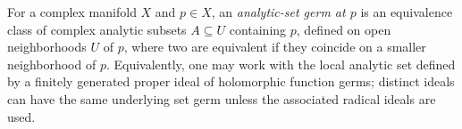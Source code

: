 
For a complex manifold $X$ and $p\in X$, an \emph{analytic-set germ at $p$} is an equivalence class of complex analytic subsets $A\subseteq U$ containing $p$, defined on open neighborhoods $U$ of $p$, where two are equivalent if they coincide on a smaller neighborhood of $p$. Equivalently, one may work with the local analytic set defined by a finitely generated proper ideal of holomorphic function germs; distinct ideals can have the same underlying set germ unless the associated radical ideals are used.
